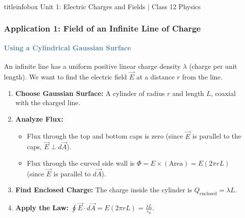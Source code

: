 \begin{frame}
\begin{frame}
\vfill

\begin{beamercolorbox}[wd=\textwidth,ht=0.5cm,dp=0.1cm,center]{titleinfobox}
    \small\color{coolgray} Unit 1: Electric Charges and Fields | Class 12 Physics
\end{beamercolorbox}
\end{frame}

\begin{frame}
\frametitle{\textsf{\textbf{Application 1: Field of an Infinite Line of Charge}}}
\framesubtitle{\textcolor{steelblue}{Using a Cylindrical Gaussian Surface}}

\begin{keybox}
\vspace{0.1cm}
An infinite line has a uniform positive linear charge density $\lambda$ (charge per unit length). We want to find the electric field $\vec{E}$ at a distance $r$ from the line.
\vspace{0.1cm}
\end{keybox}

\vspace{0.3cm}

\begin{examplebox}
\vspace{0.1cm}
\begin{enumerate}
    \item \textbf{Choose Gaussian Surface:} A cylinder of radius $r$ and length $L$, coaxial with the charged line.
    \item \textbf{Analyze Flux:}
    \begin{itemize}
        \item Flux through the top and bottom caps is zero (since $\vec{E}$ is parallel to the caps, $\vec{E} \perp d\vec{A}$).
        \item Flux through the curved side wall is $\Phi = E \times (\text{Area}) = E(2\pi rL)$ (since $\vec{E}$ is parallel to $d\vec{A}$).
    \end{itemize}
    \item \textbf{Find Enclosed Charge:} The charge inside the cylinder is $Q_{\text{enclosed}} = \lambda L$.
    \item \textbf{Apply the Law:} $\oint \vec{E} \cdot d\vec{A} = E(2\pi rL) = \frac{\lambda L}{\varepsilon_0}$.
\end{enumerate}
\vspace{0.1cm}
\end{examplebox}


\end{frame}
\end{frame}
